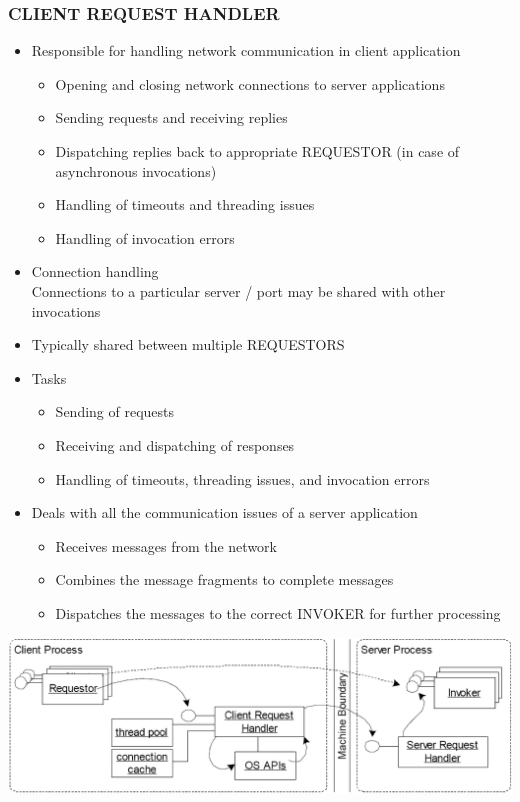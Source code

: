 \documentclass[10pt]{article}
\begin{document}
\subsubsection{CLIENT REQUEST HANDLER}
\begin{itemize}
	\item Responsible for handling network communication in client application
		\begin{itemize}
			\item Opening and closing network connections to server applications
			\item Sending requests and receiving replies
			\item Dispatching replies back to appropriate REQUESTOR (in case of asynchronous invocations)
			\item Handling of timeouts and threading issues
			\item Handling of invocation errors
		\end{itemize}
	\item Connection handling \\
		Connections to a particular server / port may be shared with other invocations
	\item Typically shared between multiple REQUESTORS
	\item Tasks
		\begin{itemize}
			\item Sending of requests
			\item Receiving and dispatching of responses
			\item Handling of timeouts, threading issues, and invocation errors
		\end{itemize}
	\item Deals with all the communication issues of a server application
		\begin{itemize}
			\item Receives messages from the network
			\item Combines the message fragments to complete messages
			\item Dispatches the messages to the correct INVOKER for further processing
		\end{itemize}
\end{itemize}
\begin{center}
	\includegraphics[scale=0.2]{client-request-handler.png}
\end{center}
\end{document}
